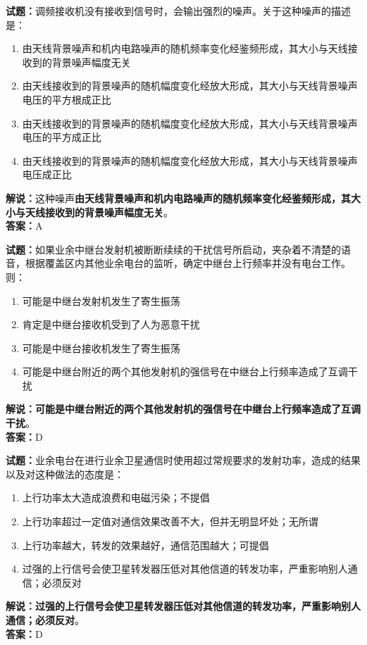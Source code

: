\documentclass{ctexbook}
\begin{document}
\vspace{1em}

\textbf{试题：}调频接收机没有接收到信号时，会输出强烈的噪声。关于这种噪声的描述是：
\begin{enumerate}[leftmargin=3em]
  \item 由天线背景噪声和机内电路噪声的随机频率变化经鉴频形成，其大小与天线接收到的背景噪声幅度无关
  \item 由天线接收到的背景噪声的随机幅度变化经放大形成，其大小与天线背景噪声电压的平方根成正比
  \item 由天线接收到的背景噪声的随机幅度变化经放大形成，其大小与天线背景噪声电压的平方成正比
  \item 由天线接收到的背景噪声的随机幅度变化经放大形成，其大小与天线背景噪声电压成正比
\end{enumerate}
\noindent\textbf{解说：}这种噪声\textbf{由天线背景噪声和机内电路噪声的随机频率变化经鉴频形成，其大小与天线接收到的背景噪声幅度无关}。\\\noindent\textbf{答案：}A

\vspace{1em}

\textbf{试题：}如果业余中继台发射机被断断续续的干扰信号所启动，夹杂着不清楚的语音，根据覆盖区内其他业余电台的监听，确定中继台上行频率并没有电台工作。则：
\begin{enumerate}[leftmargin=3em]
  \item 可能是中继台发射机发生了寄生振荡
  \item 肯定是中继台接收机受到了人为恶意干扰
  \item 可能是中继台接收机发生了寄生振荡
  \item 可能是中继台附近的两个其他发射机的强信号在中继台上行频率造成了互调干扰
\end{enumerate}
\noindent\textbf{解说：可能是中继台附近的两个其他发射机的强信号在中继台上行频率造成了互调干扰}。\\\noindent\textbf{答案：}D

\vspace{1em}

\textbf{试题：}业余电台在进行业余卫星通信时使用超过常规要求的发射功率，造成的结果以及对这种做法的态度是：
\begin{enumerate}[leftmargin=3em]
  \item 上行功率太大造成浪费和电磁污染；不提倡
  \item 上行功率超过一定值对通信效果改善不大，但并无明显坏处；无所谓
  \item 上行功率越大，转发的效果越好，通信范围越大；可提倡
  \item 过强的上行信号会使卫星转发器压低对其他信道的转发功率，严重影响别人通信；必须反对
\end{enumerate}
\noindent\textbf{解说：}\textbf{过强的上行信号会使卫星转发器压低对其他信道的转发功率，严重影响别人通信；必须反对}。\\\noindent\textbf{答案：}D
\end{document}
